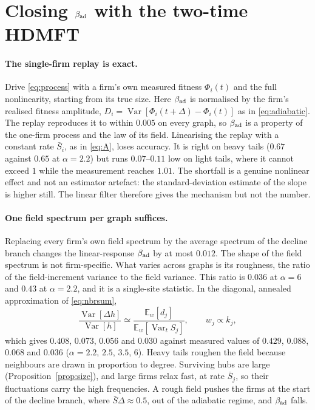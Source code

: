 \documentclass[11pt]{article}
\newcommand{\E}{\mathbb E}
\newcommand{\Var}{\operatorname{Var}}
\theoremstyle{remark}
\begin{document}
\section{Closing $\beta_{\rm ad}$ with the two-time HDMFT}
\label{sec:bad}

\paragraph{The single-firm replay is exact.}
Drive \eqref{eq:process} with a firm's own measured fitness $\Phi_i(t)$ and the full
nonlinearity, starting from its true size.  Here $\beta_{\rm ad}$ is normalised by the firm's realised fitness amplitude,
$D_i=\Var[\Phi_i(t+\Delta)-\Phi_i(t)]$ as in \eqref{eq:adiabatic}.  The replay reproduces it to
within
$0.005$ on every graph, so $\beta_{\rm ad}$ is a property of the one-firm process and the law of
its field.  Linearising the replay with a constant rate $\bar S_i$, as in \eqref{eq:A}, loses
accuracy.  It is right on heavy tails ($0.67$ against $0.65$ at $\alpha=2.2$) but runs
$0.07$--$0.11$ low on light tails, where it cannot exceed $1$ while the measurement reaches
$1.01$.  The shortfall is a genuine nonlinear effect and not an estimator artefact: the
standard-deviation estimate of the slope is higher still.  The linear filter therefore gives the
mechanism but not the number.

\paragraph{One field spectrum per graph suffices.}
Replacing every firm's own field spectrum by the average spectrum of the decline branch changes
the linear-response $\beta_{\rm ad}$ by at most $0.012$.  The shape of the field spectrum is not
firm-specific.  What varies across graphs is its roughness, the ratio of the field-increment
variance to the field variance.  This ratio is $0.036$ at $\alpha=6$ and $0.43$ at $\alpha=2.2$,
and it is a single-site statistic.  In the diagonal, annealed approximation of
\eqref{eq:nbrsum},
\begin{equation}
  \frac{\Var[\Delta h]}{\Var[h]}\simeq\frac{\E_w[d_j]}{\E_w[\Var_tS_j]},
  \qquad w_j\propto k_j,
  \label{eq:rough}
\end{equation}
which gives $0.408$, $0.073$, $0.056$ and $0.030$ against measured values of $0.429$, $0.088$,
$0.068$ and $0.036$ ($\alpha=2.2$, $2.5$, $3.5$, $6$).  Heavy tails roughen the field because
neighbours are drawn in proportion to degree.  Surviving hubs are large
(Proposition~\ref{prop:size}), and large firms relax fast, at rate $\bar S_j$, so their
fluctuations carry the high frequencies.  A rough field pushes the firms at the start of the
decline branch, where $\bar S\Delta\approx0.5$, out of the adiabatic regime, and $\beta_{\rm ad}$
falls.
\end{document}
